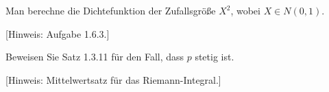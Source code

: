 \begin{aufg}
  Man berechne die Dichtefunktion der Zufallsgröße $X^2$, wobei $X \in N(0, 1)$.

  [Hinweis: Aufgabe 1.6.3.]
\end{aufg}

\begin{aufg}
  Beweisen Sie Satz 1.3.11 für den Fall, dass $p$ stetig ist.

  [Hinweis: Mittelwertsatz für das Riemann-Integral.]
\end{aufg}


